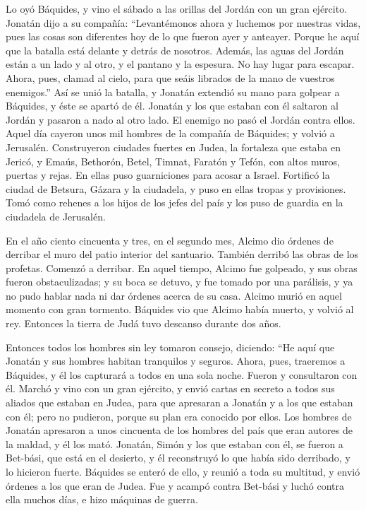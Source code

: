  Lo oyó Báquides, y vino el sábado a las orillas del
Jordán con un gran ejército.  Jonatán dijo a su compañía:
``Levantémonos ahora y luchemos por nuestras vidas, pues las cosas son
diferentes hoy de lo que fueron ayer y anteayer.  Porque
he aquí que la batalla está delante y detrás de nosotros. Además, las
aguas del Jordán están a un lado y al otro, y el pantano y la espesura.
No hay lugar para escapar.  Ahora, pues, clamad al cielo,
para que seáis librados de la mano de vuestros enemigos.''
 Así se unió la batalla, y Jonatán extendió su mano para
golpear a Báquides, y éste se apartó de él.  Jonatán y
los que estaban con él saltaron al Jordán y pasaron a nado al otro lado.
El enemigo no pasó el Jordán contra ellos.  Aquel día
cayeron unos mil hombres de la compañía de Báquides;  y
volvió a Jerusalén. Construyeron ciudades fuertes en Judea, la fortaleza
que estaba en Jericó, y Emaús, Bethorón, Betel, Timnat, Faratón y Tefón,
con altos muros, puertas y rejas.  En ellas puso
guarniciones para acosar a Israel.  Fortificó la ciudad
de Betsura, Gázara y la ciudadela, y puso en ellas tropas y provisiones.
 Tomó como rehenes a los hijos de los jefes del país y
los puso de guardia en la ciudadela de Jerusalén.

 En el año ciento cincuenta y tres, en el segundo mes,
Alcimo dio órdenes de derribar el muro del patio interior del santuario.
También derribó las obras de los profetas.  Comenzó a
derribar. En aquel tiempo, Alcimo fue golpeado, y sus obras fueron
obstaculizadas; y su boca se detuvo, y fue tomado por una parálisis, y
ya no pudo hablar nada ni dar órdenes acerca de su casa. 
Alcimo murió en aquel momento con gran tormento. 
Báquides vio que Alcimo había muerto, y volvió al rey. Entonces la
tierra de Judá tuvo descanso durante dos años.

 Entonces todos los hombres sin ley tomaron consejo,
diciendo: ``He aquí que Jonatán y sus hombres habitan tranquilos y
seguros. Ahora, pues, traeremos a Báquides, y él los capturará a todos
en una sola noche.  Fueron y consultaron con él.
 Marchó y vino con un gran ejército, y envió cartas en
secreto a todos sus aliados que estaban en Judea, para que apresaran a
Jonatán y a los que estaban con él; pero no pudieron, porque su plan era
conocido por ellos.  Los hombres de Jonatán apresaron a
unos cincuenta de los hombres del país que eran autores de la maldad, y
él los mató.  Jonatán, Simón y los que estaban con él, se
fueron a Bet-bási, que está en el desierto, y él reconstruyó lo que
había sido derribado, y lo hicieron fuerte.  Báquides se
enteró de ello, y reunió a toda su multitud, y envió órdenes a los que
eran de Judea.  Fue y acampó contra Bet-bási y luchó
contra ella muchos días, e hizo máquinas de guerra.

